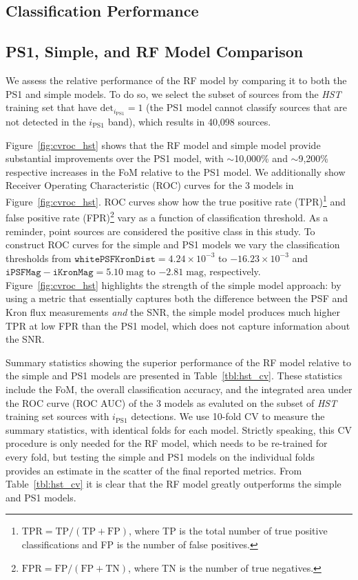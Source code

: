 \documentclass[twocolumn]{aastex62}
\begin{document}
\begin{CJK*}{UTF8}{gbsn}
\section{Classification Performance}

\subsection{PS1, Simple, and RF Model Comparison}\label{sec:comp_hst}

We assess the relative performance of the RF model by comparing it to both
the PS1 and simple models. To do so, we select the subset of sources from
the \textit{HST} training set that have $\mathrm{det}_{i_\mathrm{PS1}} = 1$
(the PS1 model cannot classify sources that are not detected in the
$i_\mathrm{PS1}$ band), which results in 40,098 sources.

Figure~\ref{fig:cvroc_hst} shows that the RF model and simple model provide
substantial improvements over the PS1 model, with $\sim$10,000\% and
$\sim$9,200\% respective increases in the FoM relative to the PS1 model. We
additionally show Receiver Operating Characteristic (ROC) curves for the 3
models in Figure~\ref{fig:cvroc_hst}. ROC curves show how the true positive
rate (TPR)\footnote{$\mathrm{TPR} = \mathrm{TP}/(\mathrm{TP} +
\mathrm{FP})$, where TP is the total number of true positive classifications
and FP is the number of false positives.} and false positive rate
(FPR)\footnote{$\mathrm{FPR} = \mathrm{FP}/(\mathrm{FP}+\mathrm{TN})$, where
TN is the number of true negatives.} vary as a function of classification
threshold. As a reminder, point sources are considered the positive class in
this study. To construct ROC curves for the simple and PS1 models we vary
the classification thresholds from $\mathtt{whitePSFKronDist} = 4.24\times
10^{-3}$ to $-16.23\times10^{-3}$ and $\mathtt{iPSFMag} - \mathtt{iKronMag}
= 5.10\;\mathrm{mag}$ to $-2.81\;\mathrm{mag}$, respectively.
Figure~\ref{fig:cvroc_hst} highlights the strength of the simple model
approach: by using a metric that essentially captures both the difference
between the PSF and Kron flux measurements \textit{and} the SNR, the simple
model produces much higher TPR at low FPR than the PS1 model, which does not
capture information about the SNR.

Summary statistics showing the superior performance of the RF model relative
to the simple and PS1 models are presented in Table~\ref{tbl:hst_cv}. These
statistics include the FoM, the overall classification accuracy, and the
integrated area under the ROC curve (ROC AUC) of the 3 models as evaluted on
the subset of \textit{HST} training set sources with $i_\mathrm{PS1}$
detections. We use 10-fold CV to measure the summary statistics, with
identical folds for each model. Strictly speaking, this CV procedure is only
needed for the RF model, which needs to be re-trained for every fold, but
testing the simple and PS1 models on the individual folds provides an
estimate in the scatter of the final reported metrics. From
Table~\ref{tbl:hst_cv} it is clear that the RF model greatly outperforms the
simple and PS1 models.



\end{CJK*}
\end{document}
